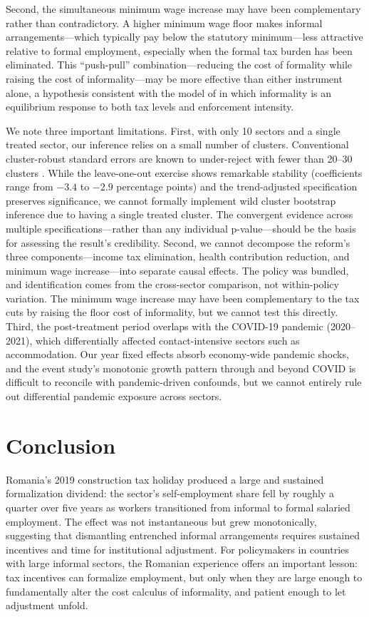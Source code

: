 \documentclass[12pt]{article}
\begin{document}
Second, the simultaneous minimum wage increase may have been complementary rather than contradictory. A higher minimum wage floor makes informal arrangements---which typically pay below the statutory minimum---less attractive relative to formal employment, especially when the formal tax burden has been eliminated. This ``push-pull'' combination---reducing the cost of formality while raising the cost of informality---may be more effective than either instrument alone, a hypothesis consistent with the model of \citet{ulyssea2018firms} in which informality is an equilibrium response to both tax levels and enforcement intensity.

We note three important limitations. First, with only 10 sectors and a single treated sector, our inference relies on a small number of clusters. Conventional cluster-robust standard errors are known to under-reject with fewer than 20--30 clusters \citep{cameron2008bootstrap}. While the leave-one-out exercise shows remarkable stability (coefficients range from $-3.4$ to $-2.9$ percentage points) and the trend-adjusted specification preserves significance, we cannot formally implement wild cluster bootstrap inference due to having a single treated cluster. The convergent evidence across multiple specifications---rather than any individual p-value---should be the basis for assessing the result's credibility. Second, we cannot decompose the reform's three components---income tax elimination, health contribution reduction, and minimum wage increase---into separate causal effects. The policy was bundled, and identification comes from the cross-sector comparison, not within-policy variation. The minimum wage increase may have been complementary to the tax cuts by raising the floor cost of informality, but we cannot test this directly. Third, the post-treatment period overlaps with the COVID-19 pandemic (2020--2021), which differentially affected contact-intensive sectors such as accommodation. Our year fixed effects absorb economy-wide pandemic shocks, and the event study's monotonic growth pattern through and beyond COVID is difficult to reconcile with pandemic-driven confounds, but we cannot entirely rule out differential pandemic exposure across sectors.

\section{Conclusion}
\label{sec:conclusion}

Romania's 2019 construction tax holiday produced a large and sustained formalization dividend: the sector's self-employment share fell by roughly a quarter over five years as workers transitioned from informal to formal salaried employment. The effect was not instantaneous but grew monotonically, suggesting that dismantling entrenched informal arrangements requires sustained incentives and time for institutional adjustment. For policymakers in countries with large informal sectors, the Romanian experience offers an important lesson: tax incentives can formalize employment, but only when they are large enough to fundamentally alter the cost calculus of informality, and patient enough to let adjustment unfold.
\end{document}
